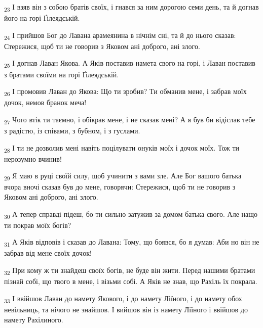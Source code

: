 \begin{tcolorbox}
\textsubscript{23} І взяв він з собою братів своїх, і гнався за ним дорогою семи день, та й догнав його на горі Ґілеядській.
\end{tcolorbox}
\begin{tcolorbox}
\textsubscript{24} І прийшов Бог до Лавана арамеянина в нічнім сні, та й до нього сказав: Стережися, щоб ти не говорив з Яковом ані доброго, ані злого.
\end{tcolorbox}
\begin{tcolorbox}
\textsubscript{25} І догнав Лаван Якова. А Яків поставив намета свого на горі, і Лаван поставив з братами своїми на горі Ґілеядській.
\end{tcolorbox}
\begin{tcolorbox}
\textsubscript{26} І промовив Лаван до Якова: Що ти зробив? Ти обманив мене, і забрав моїх дочок, немов бранок меча!
\end{tcolorbox}
\begin{tcolorbox}
\textsubscript{27} Чого втік ти таємно, і обікрав мене, і не сказав мені? А я був би відіслав тебе з радістю, із співами, з бубном, і з гуслами.
\end{tcolorbox}
\begin{tcolorbox}
\textsubscript{28} І ти не дозволив мені навіть поцілувати онуків моїх і дочок моїх. Тож ти нерозумно вчинив!
\end{tcolorbox}
\begin{tcolorbox}
\textsubscript{29} Я маю в руці своїй силу, щоб учинити з вами зле. Але Бог вашого батька вчора вночі сказав був до мене, говорячи: Стережися, щоб ти не говорив з Яковом ані доброго, ані злого.
\end{tcolorbox}
\begin{tcolorbox}
\textsubscript{30} А тепер справді підеш, бо ти сильно затужив за домом батька свого. Але нащо ти покрав моїх богів?
\end{tcolorbox}
\begin{tcolorbox}
\textsubscript{31} А Яків відповів і сказав до Лавана: Тому, що боявся, бо я думав: Аби но він не забрав від мене своїх дочок!
\end{tcolorbox}
\begin{tcolorbox}
\textsubscript{32} При кому ж ти знайдеш своїх богів, не буде він жити. Перед нашими братами пізнай собі, що твого в мене, і візьми собі. А Яків не знав, що Рахіль їх покрала.
\end{tcolorbox}
\begin{tcolorbox}
\textsubscript{33} І ввійшов Лаван до намету Якового, і до намету Ліїного, і до намету обох невільниць, та нічого не знайшов. І вийшов він із намету Ліїного і ввійшов до намету Рахілиного.
\end{tcolorbox}
